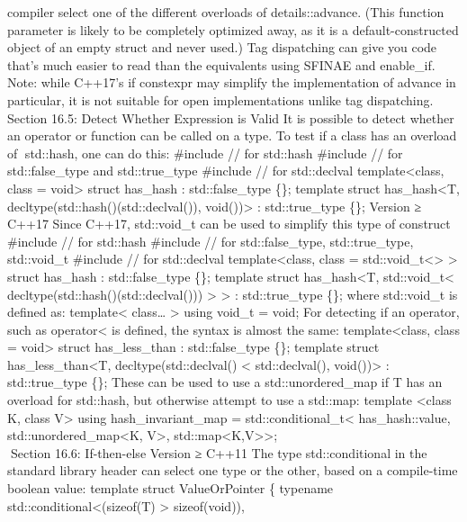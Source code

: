 {compiler select one of the diﬀerent overloads of details::advance. (This
function parameter is likely to be completely optimized away, as it is a
default-constructed object of an empty struct and never used.) Tag
dispatching can give you code that's much easier to read than the
equivalents using SFINAE and enable\_if. Note: while C++17's if
constexpr may simplify the implementation of advance in particular, it
is not suitable for open implementations unlike tag dispatching. Section
16.5: Detect Whether Expression is Valid It is possible to detect
whether an operator or function can be called on a type. To test if a
class has an overload of std::hash, one can do this: \#include // for
std::hash \#include // for std::false\_type and std::true\_type
\#include // for std::declval template\textless class, class =
void\textgreater{} struct has\_hash : std::false\_type \{\}; template
struct has\_hash\textless T, decltype(std::hash()(std::declval()),
void())\textgreater{} : std::true\_type \{\}; Version ≥ C++17 Since
C++17, std::void\_t can be used to simplify this type of construct
\#include // for std::hash \#include // for std::false\_type,
std::true\_type, std::void\_t \#include // for std::declval
template\textless class, class = std::void\_t\textless\textgreater{}
\textgreater{} struct has\_hash : std::false\_type \{\}; template struct
has\_hash\textless T, std::void\_t\textless{}
decltype(std::hash()(std::declval())) \textgreater{} \textgreater{} :
std::true\_type \{\}; where std::void\_t is deﬁned as:
template\textless{} class\ldots{} \textgreater{} using void\_t = void;
For detecting if an operator, such as operator\textless{} is deﬁned, the
syntax is almost the same: template\textless class, class =
void\textgreater{} struct has\_less\_than : std::false\_type \{\};
template struct has\_less\_than\textless T, decltype(std::declval()
\textless{} std::declval(), void())\textgreater{} : std::true\_type
\{\}; These can be used to use a std::unordered\_map if T has an
overload for std::hash, but otherwise attempt to use a std::map:
template \textless class K, class V\textgreater{} using
hash\_invariant\_map = std::conditional\_t\textless{} has\_hash::value,
std::unordered\_map\textless K, V\textgreater,
std::map\textless K,V\textgreater\textgreater;\\
Section 16.6: If-then-else Version ≥ C++11 The type std::conditional in
the standard library header can select one type or the other, based on a
compile-time boolean value: template struct ValueOrPointer \{ typename
std::conditional\textless(sizeof(T) \textgreater{} sizeof(void})),
